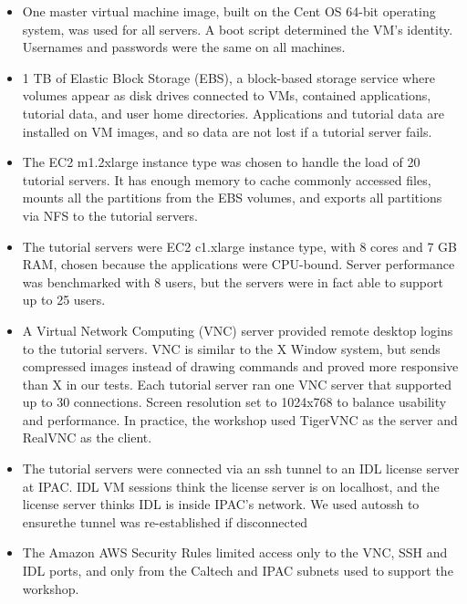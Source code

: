 
\begin{itemize}

\item One master virtual machine image, built on the Cent OS 64-bit operating system, was used for all servers.
A boot script determined the VM’s identity.
Usernames and passwords were the same on all machines. 
\item
1 TB of Elastic Block Storage (EBS), a 
block-based storage service where
volumes appear as disk drives connected to VMs,
contained applications, tutorial data, and user home directories. Applications and tutorial data are installed on VM images, and so data are not lost if a tutorial server fails.

\item
The EC2 m1.2xlarge instance type was chosen to handle the load of 20 tutorial servers. It has enough memory to cache commonly accessed files,  mounts all the partitions from the EBS volumes, and exports all partitions via NFS to the tutorial servers.
\item
The tutorial servers were EC2 c1.xlarge instance type, with 
8 cores and 7 GB RAM, chosen because the applications were CPU-bound.
Server performance was benchmarked with 8 users, but the servers were in fact able to support up to 25 users. 
\item
A Virtual Network Computing (VNC) server provided remote desktop logins to the tutorial servers. VNC is similar to the X Window system, but sends compressed images instead of drawing commands and proved more responsive than X in our tests. Each tutorial server ran one VNC server that supported up to 30 connections.  Screen resolution set to 1024x768 to balance usability and performance. In practice,  the workshop used TigerVNC as the server and RealVNC as the client.
\item
The tutorial servers were connected via an ssh tunnel to an IDL license server at IPAC. 
IDL VM sessions think the license server is on localhost, and the license server thinks IDL is inside IPAC's network. We used autossh to ensurethe tunnel was re-established if disconnected
\item
The Amazon AWS Security Rules limited access only to the VNC, SSH and IDL ports, and only from the Caltech and IPAC subnets  used to support the workshop.
\end{itemize}

